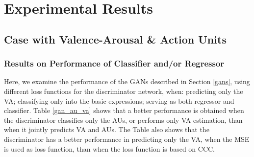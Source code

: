 \documentclass[a4paper, 10pt, conference]{ieeeconf}      %
\begin{document}
\section{Experimental Results}\label{experiments}


\subsection{Case with Valence-Arousal \& Action Units}



\subsubsection{Results on Performance of Classifier and/or Regressor}

Here, we examine the performance of the GANs described in Section \ref{gans}, using different loss functions for the discriminator network, when: predicting only the VA; classifying only into the basic expressions; serving as both regressor and classifier. Table \ref{gan_au_va} shows that a better performance is obtained when the discriminator classifies only the AUs, or  performs only VA estimation, than when it jointly predicts VA and AUs. The Table also shows that the discriminator has a better performance in predicting only the VA, when the MSE is used as loss function, than  when the loss function is based on CCC.
\end{document}
